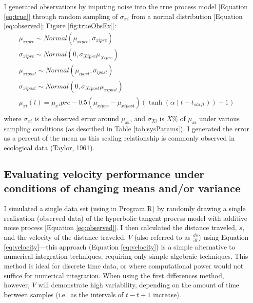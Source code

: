 \documentclass[12pt,twoside,openany]{reedthesis}
\begin{document}
I generated observations by imputing noise into the true process model {[}Equation \eqref{eq:true}{]} through random sampling of \(\sigma_x{_i}\) from a normal distribution {[}Equation \eqref{eq:observed}; Figure \ref{fig:trueObsEx}{]}:
\begin{equation}
\begin{array}{rcl}
\mu_{xipre}\sim Normal(\mu_{xipre},\sigma_{xipre}) \\ 
\sigma_{xipre} \sim Normal(0,\sigma_{Xipre}\mu_{Xipre}) \\
\mu_{xipost} \sim Normal(\mu_{ipost},\sigma_{ipost}) \\ 
\sigma_{xipost} \sim Normal(0,\sigma_{Xipost}\mu_{xipost}) \\
\mu_{xi}(t) = \mu_x{_ipre}  - 0.5(\mu_{xipre}-\mu_{xipost})(\tanh(\alpha (t-t_{shift}))+1) \\
\end{array}
\label{eq:observed}
\end{equation}
where \(\sigma_{xi}\) is the observed error around \(\mu_{xi}\), and \(\sigma_{Xi}\) is \(X\%\) of \(\mu_{xi}\) under various sampling conditions (as described in Table \ref{tab:sysParams}). I generated the error as a percent of the mean as this scaling relationship is commonly observed in ecological data (Taylor, \protect\hyperlink{ref-taylor1961aggregation}{1961}).

\hypertarget{evaluating-velocity-performance-under-conditions-of-changing-means-andor-variance}{%
\subsection{Evaluating velocity performance under conditions of changing means and/or variance}\label{evaluating-velocity-performance-under-conditions-of-changing-means-andor-variance}}

I simulated a single data set (using in Program R) by randomly drawing a single realisation (observed data) of the hyperbolic tangent process model with additive noise process {[}Equation \eqref{eq:observed}{]}. I then calculated the distance traveled, \(s\), and the velocity of the distance traveled, \(V\) (also referred to as \(\frac{ds}{dt}\)) using Equation \eqref{eq:velocity}---this approach (Equation \eqref{eq:velocity}) is a simple alternative to numerical integration techniques, requiring only simple algebraic techniques. This method is ideal for discrete time data, or where computational power would not suffice for numerical integration. When using the first differences method, however, \(V\) will demonstrate high variability, depending on the amount of time between samples (i.e.~as the intervals of \(t-t+1\) increase).
\end{document}
